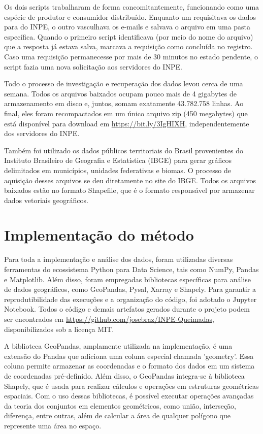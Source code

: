 \documentclass[cic,tc]{iiufrgs}
\begin{document}
Os dois scripts trabalharam de forma concomitantemente, funcionando como uma espécie de produtor e consumidor distribuído. Enquanto um requisitava os dados para do INPE, o outro vasculhava os e-mails e salvava o arquivo em uma pasta específica. Quando o primeiro script identificava (por meio do nome do arquivo) que a resposta já estava salva, marcava a requisição como concluída no registro. Caso uma requisição permanecesse por mais de 30 minutos no estado pendente, o script fazia uma nova solicitação aos servidores do INPE.

Todo o processo de investigação e recuperação dos dados levou cerca de uma semana. Todos os arquivos baixados ocupam pouco mais de 4 gigabytes de armazenamento em disco e, juntos, somam exatamente 43.782.758 linhas. Ao final, eles foram recompactados em um único arquivo zip (450 megabytes) que está disponível para download em \url{https://bit.ly/3IgHIXH}, independentemente dos servidores do INPE.

Também foi utilizado os dados públicos territoriais do Brasil provenientes do Instituto Brasileiro de Geografia e Estatística (IBGE) para gerar gráficos delimitados em municípios, unidades federativas e biomas. O processo de aquisição desses arquivos se deu diretamente no site do IBGE. Todos os arquivos baixados estão no formato Shapefile, que é o formato responsável por armazenar dados vetoriais geográficos.


\section{Implementação do método}

Para toda a implementação e análise dos dados, foram utilizadas diversas ferramentas do ecossistema Python para Data Science, tais como NumPy, Pandas e Matplotlib. Além disso, foram empregadas bibliotecas específicas para análise de dados geográficos, como GeoPandas, Pysal, Xarray e Shapely. Para garantir a reprodutibilidade das execuções e a organização do código, foi adotado o Jupyter Notebook. Todos o código e demais artefatos gerados durante o projeto podem ser encontrados em \url{https://github.com/josebraz/INPE-Queimadas}, disponibilizados sob a licença MIT. \par

A biblioteca GeoPandas, amplamente utilizada na implementação, é uma extensão do Pandas que adiciona uma coluna especial chamada 'geometry'. Essa coluna permite armazenar as coordenadas e o formato dos dados em um sistema de coordenadas pré-definido. Além disso, o GeoPandas integra-se à biblioteca Shapely, que é usada para realizar cálculos e operações em estruturas geométricas espaciais. Com o uso dessas bibliotecas, é possível executar operações avançadas da teoria dos conjuntos em elementos geométricos, como união, interseção, diferença, entre outras, além de calcular a área de qualquer polígono que represente uma área no espaço. \par
\end{document}
